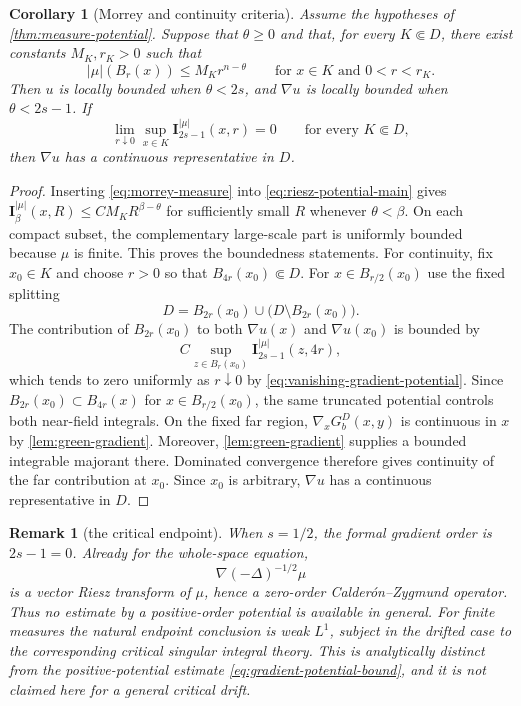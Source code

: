 \documentclass[10pt,a4paper]{amsart}
\numberwithin{equation}{section}
\newtheorem{corollary}[theorem]{Corollary}
\newtheorem{remark}[theorem]{Remark}
\newcommand{\I}{\mathbf I}
\newcommand{\rev}[1]{#1}
\begin{document}
\begin{corollary}[Morrey and continuity criteria]
\label{cor:measure-morrey}
Assume the hypotheses of \cref{thm:measure-potential}.  Suppose that
$\theta\ge0$ and that, for every $K\Subset D$, there exist constants
$M_K,r_K>0$ such that
\begin{equation}\label{eq:morrey-measure}
 |\mu|(B_r(x))\le M_K r^{n-\theta}
 \qquad\text{for }x\in K\text{ and }0<r<r_K.
\end{equation}
\rev{Then} $u$ is locally bounded when $\theta<2s$, and $\nabla u$ is locally
bounded when $\theta<2s-1$.  If
\begin{equation}\label{eq:vanishing-gradient-potential}
 \lim_{r\downarrow0}\sup_{x\in K}
 \I_{2s-1}^{|\mu|}(x,r)=0
 \qquad\text{for every }K\Subset D,
\end{equation}
then $\nabla u$ has a continuous representative in $D$.
\end{corollary}

\begin{proof}
Inserting \eqref{eq:morrey-measure} into
\eqref{eq:riesz-potential-main} gives
$\I_\beta^{|\mu|}(x,R)\le CM_K R^{\beta-\theta}$ for sufficiently small
$R$ whenever $\theta<\beta$.  On each compact subset, the complementary
large-scale part is uniformly bounded because $\mu$ is finite.  This proves
the boundedness statements.  For continuity,
fix $x_0\in K$ and choose $r>0$ so that
$B_{4r}(x_0)\Subset D$.  For $x\in B_{r/2}(x_0)$ use the fixed splitting
\[
 D=B_{2r}(x_0)\cup\bigl(D\setminus B_{2r}(x_0)\bigr).
\]
The contribution of $B_{2r}(x_0)$ to both $\nabla u(x)$ and
$\nabla u(x_0)$ is bounded by
\[
 C\sup_{z\in B_r(x_0)}\I_{2s-1}^{|\mu|}(z,4r),
\]
which tends to zero uniformly as $r\downarrow0$ by
\eqref{eq:vanishing-gradient-potential}.  \rev{Since
$B_{2r}(x_0)\subset B_{4r}(x)$ for $x\in B_{r/2}(x_0)$, the same
truncated potential controls both near-field integrals.}  On the fixed far region,
$\nabla_xG_b^D(x,y)$ is continuous in $x$ by
\cref{lem:green-gradient}.  Moreover,
\cref{lem:green-gradient} supplies a bounded integrable majorant there.
Dominated convergence therefore gives continuity of the far contribution
at $x_0$.  Since $x_0$ is arbitrary, $\nabla u$ has a continuous
representative in $D$.
\end{proof}

\begin{remark}[the critical endpoint]
When $s=1/2$, the formal gradient order is $2s-1=0$.  Already for the
whole-space equation,
\[
 \nabla(-\Delta)^{-1/2}\mu
\]
is a vector Riesz transform of $\mu$, hence a zero-order Calder\'on--Zygmund
operator.  Thus no estimate by a positive-order potential is available in
general.  For finite measures the natural endpoint conclusion is weak
$L^1$, subject in the drifted case to the corresponding critical singular
integral theory.  This is analytically distinct from the positive-potential
estimate \eqref{eq:gradient-potential-bound}, and it is not claimed here for
a general critical drift.
\end{remark}
\end{document}
